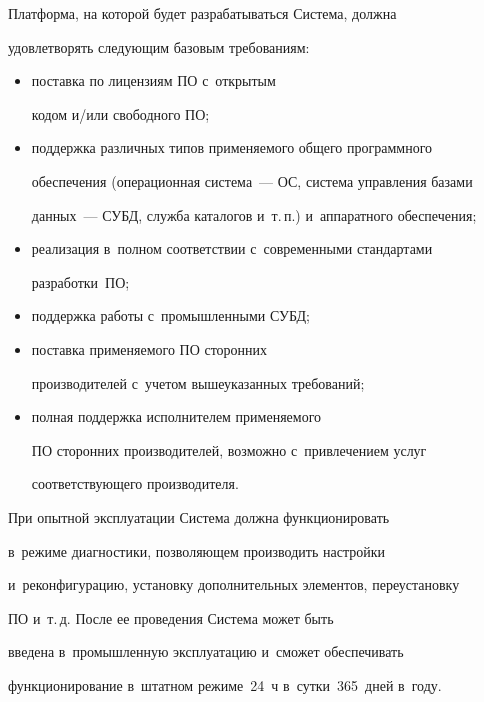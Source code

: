      


     Платформа, на которой будет разрабатываться Система, должна 


удовлетворять следующим базовым требованиям:


     \begin{itemize}


     \item поставка по лицензиям ПО с~открытым 


кодом и/или свободного ПО;


     \item поддержка различных типов применяемого общего программного 


обеспечения (операционная система~--- ОС, система управления базами 


данных~--- СУБД, служба каталогов и~т.\,п.) и~аппаратного обеспечения;


     \item реализация в~полном соответствии с~современными стандартами 


разработки~ПО;


     \item поддержка работы с~промышленными СУБД;


     \item поставка применяемого ПО сторонних 


производителей с~учетом вышеуказанных требований;


     \item полная поддержка исполнителем применяемого 


ПО сторонних производителей, возможно с~привлечением услуг 


соответствующего производителя.


     \end{itemize}


     


     При опытной эксплуатации Система должна функционировать 


в~режиме диагностики, позволяющем производить настройки 


и~реконфигурацию, установку дополнительных элементов, переустановку 


ПО и~т.\,д. После ее проведения Сис\-те\-ма может быть 


введена в~промышленную эксплуатацию и~сможет обеспечивать 


функционирование в~штатном режиме~24~ч в~сутки~365~дней в~году.


